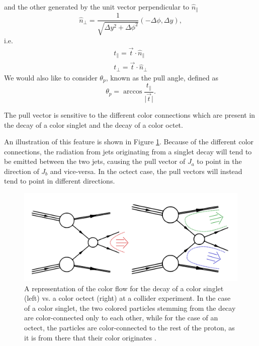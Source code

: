 \documentclass[10pt,a4paper]{book}
\begin{document}
and the other generated by the unit vector perpendicular to $\hat{n}_\parallel$
\begin{equation}
\hat{n}_\perp = \frac{1}{\sqrt{\Delta y^2 + \Delta \phi^2}}\left(-\Delta \phi, \Delta y \right),
\end{equation}
i.e.
\begin{gather}
t_\parallel = \vec{t}\cdot \hat{n}_\parallel \\
t_\perp = \vec{t}\cdot \hat{n}_\perp
\end{gather}
We would also like to consider $\theta_{p}$, known as the pull angle, defined as
\begin{equation}
\theta_p = \arccos \frac{t_\parallel}{\vert \vec{t} \vert}.
\end{equation} 

The pull vector is sensitive to the different color connections which are present in the decay of a color singlet and the decay of a color octet.

 An illustration of this feature is shown in Figure \ref{color connections}. Because of the different color connections, the radiation from jets originating from a singlet decay will tend to be emitted between the two jets, causing the pull vector of $J_a$ to point in the direction of $J_b$ and vice-versa. In the octect case, the pull vectors will instead tend to point in different directions.
\begin{figure}[ht]
\centering
\includegraphics[scale=0.2]{ch4_images/color_configurations}
\caption{A representation of the color flow for the decay of a color singlet (left) vs. a color octect (right) at a collider experiment. In the case of a color singlet, the two colored particles stemming from the decay are color-connected only to each other, while for the case of an octect, the particles are color-connected to the rest of the proton, as it is from there that their color originates \cite{Gallicchio:2010sw}.}
\label{color connections}
\end{figure}
\end{document}
